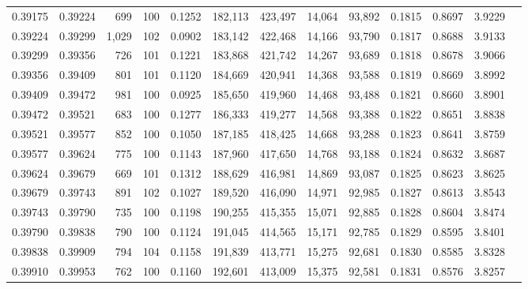 \begin{tabular}{rrrrrrrrrrrrr}
0.39175 & 0.39224 &   699 & 100 &                                     0.1252 & 182,113 & 423,497 &  14,064 &  93,892 & 0.1815 & 0.8697 & 3.9229 \\
0.39224 & 0.39299 & 1,029 & 102 &                                     0.0902 & 183,142 & 422,468 &  14,166 &  93,790 & 0.1817 & 0.8688 & 3.9133 \\
0.39299 & 0.39356 &   726 & 101 &                                     0.1221 & 183,868 & 421,742 &  14,267 &  93,689 & 0.1818 & 0.8678 & 3.9066 \\
0.39356 & 0.39409 &   801 & 101 &                                     0.1120 & 184,669 & 420,941 &  14,368 &  93,588 & 0.1819 & 0.8669 & 3.8992 \\
0.39409 & 0.39472 &   981 & 100 &                                     0.0925 & 185,650 & 419,960 &  14,468 &  93,488 & 0.1821 & 0.8660 & 3.8901 \\
0.39472 & 0.39521 &   683 & 100 &                                     0.1277 & 186,333 & 419,277 &  14,568 &  93,388 & 0.1822 & 0.8651 & 3.8838 \\
0.39521 & 0.39577 &   852 & 100 &                                     0.1050 & 187,185 & 418,425 &  14,668 &  93,288 & 0.1823 & 0.8641 & 3.8759 \\
0.39577 & 0.39624 &   775 & 100 &                                     0.1143 & 187,960 & 417,650 &  14,768 &  93,188 & 0.1824 & 0.8632 & 3.8687 \\
0.39624 & 0.39679 &   669 & 101 &                                     0.1312 & 188,629 & 416,981 &  14,869 &  93,087 & 0.1825 & 0.8623 & 3.8625 \\
0.39679 & 0.39743 &   891 & 102 &                                     0.1027 & 189,520 & 416,090 &  14,971 &  92,985 & 0.1827 & 0.8613 & 3.8543 \\
0.39743 & 0.39790 &   735 & 100 &                                     0.1198 & 190,255 & 415,355 &  15,071 &  92,885 & 0.1828 & 0.8604 & 3.8474 \\
0.39790 & 0.39838 &   790 & 100 &                                     0.1124 & 191,045 & 414,565 &  15,171 &  92,785 & 0.1829 & 0.8595 & 3.8401 \\
0.39838 & 0.39909 &   794 & 104 &                                     0.1158 & 191,839 & 413,771 &  15,275 &  92,681 & 0.1830 & 0.8585 & 3.8328 \\
0.39910 & 0.39953 &   762 & 100 &                                     0.1160 & 192,601 & 413,009 &  15,375 &  92,581 & 0.1831 & 0.8576 & 3.8257 \\

\end{tabular}
